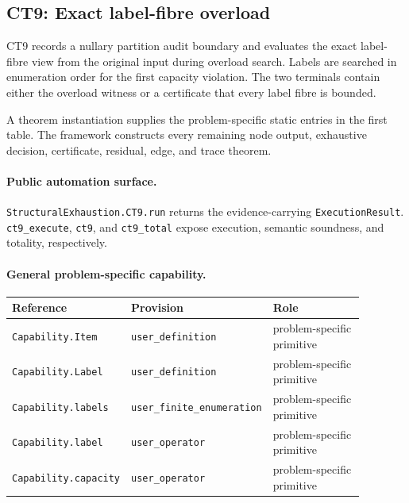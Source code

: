 \subsection{CT9: Exact label-fibre overload}
\label{sec:ct9-automation}

CT9 records a nullary partition audit boundary and evaluates the exact label-fibre view from the original input during overload search. Labels are searched in enumeration order for the first capacity violation. The two terminals contain either the overload witness or a certificate that every label fibre is bounded.

A theorem instantiation supplies the problem-specific static entries in the first table. The framework constructs every remaining node output, exhaustive decision, certificate, residual, edge, and trace theorem.

\paragraph{Public automation surface.}
\texttt{StructuralExhaustion.CT9.run} returns the evidence-carrying \texttt{ExecutionResult}. \texttt{ct9\_\allowbreak{}execute}, \texttt{ct9}, and \texttt{ct9\_\allowbreak{}total} expose execution, semantic soundness, and totality, respectively.

\paragraph{General problem-specific capability.}
\begingroup\small
\begin{longtable}{@{}p{0.27\linewidth}p{0.15\linewidth}p{0.46\linewidth}@{}}
\toprule
Reference & Provision & Role \\
\midrule
\endhead
\texttt{Capability.\allowbreak{}Item} & \texttt{user\_\allowbreak{}definition} & problem-specific primitive \\
\texttt{Capability.\allowbreak{}Label} & \texttt{user\_\allowbreak{}definition} & problem-specific primitive \\
\texttt{Capability.\allowbreak{}labels} & \texttt{user\_\allowbreak{}finite\_\allowbreak{}enumeration} & problem-specific primitive \\
\texttt{Capability.\allowbreak{}label} & \texttt{user\_\allowbreak{}operator} & problem-specific primitive \\
\texttt{Capability.\allowbreak{}capacity} & \texttt{user\_\allowbreak{}operator} & problem-specific primitive \\
\bottomrule
\end{longtable}
\endgroup

